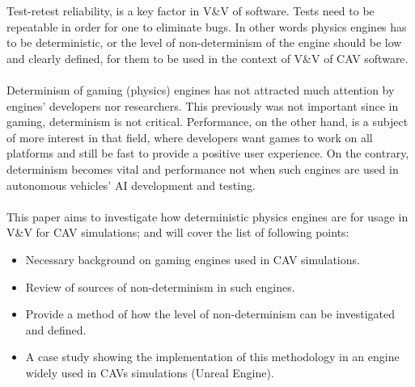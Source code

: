 Test-retest reliability, is a key factor in V\&V of software. Tests need to be repeatable in order for one to eliminate bugs. 
In other words physics engines has to be deterministic, or the level of non-determinism of the engine should be low and clearly defined, for them to be used in the context of V\&V of CAV software.\\\\
 Determinism of gaming (physics) engines has not attracted much attention by engines' developers nor researchers. This previously was not important since in gaming, determinism is not critical. 
Performance, on the other hand, is a subject of more interest in that field, where developers want games to work on all platforms and still be fast to provide a positive user experience. 
On the contrary, determinism becomes vital and performance not when such engines are used in autonomous vehicles' AI development and testing. \\\\
This paper aims to investigate how deterministic physics engines are for usage in V\&V for CAV simulations; and will cover the list of following points:
\begin{itemize}[leftmargin=*]
    \item Necessary background on gaming engines used in CAV simulations.
    \item Review of sources of non-determinism in such engines.
    \item Provide a method of how the level of non-determinism can be investigated and defined.
    \item A case study showing the implementation of this methodology in an engine widely used in CAVs simulations (Unreal Engine).
\end{itemize}
 
 



